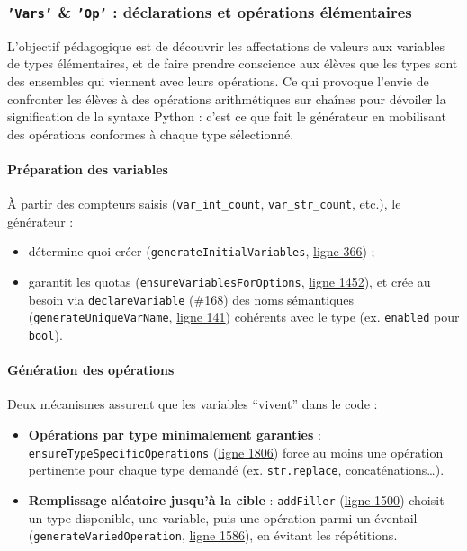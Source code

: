 \documentclass[11pt,a4paper]{article}
\begin{document}
\subsubsection{\texttt{'Vars'} \& \texttt{'Op'} : déclarations et opérations élémentaires}
L'objectif pédagogique est de découvrir les affectations de valeurs aux variables de types élémentaires, et de faire prendre conscience aux élèves que les types sont des ensembles qui viennent avec leurs opérations. Ce qui provoque l'envie de confronter les élèves à des opérations arithmétiques sur chaînes pour dévoiler la signification de la syntaxe Python : c'est ce que fait le générateur en mobilisant des opérations conformes à chaque type sélectionné.

\paragraph{Préparation des variables}
À partir des compteurs saisis (\texttt{var\_int\_count}, \texttt{var\_str\_count}, etc.), le générateur :
\begin{itemize}
  \item détermine quoi créer (\texttt{generateInitialVariables}, \href{https://github.com/edu-mateescoj/gyminf/blob/main/static/js/code-generator.js#L1083}{ligne 366}) ;
  \item garantit les quotas (\texttt{ensureVariablesForOptions}, \href{https://github.com/edu-mateescoj/gyminf/blob/main/static/js/code-generator.js#L1083}{ligne 1452}), et crée au besoin via \texttt{declareVariable} (\#168) des noms sémantiques (\texttt{generateUniqueVarName}, \href{https://github.com/edu-mateescoj/gyminf/blob/main/static/js/code-generator.js#L1083}{ligne 141}) cohérents avec le type (ex. \texttt{enabled} pour \texttt{bool}).
\end{itemize}

\paragraph{Génération des opérations}
Deux mécanismes assurent que les variables “vivent” dans le code :
\begin{itemize}
  \item \textbf{Opérations par type minimalement garanties} : \texttt{ensureTypeSpecificOperations} (\href{https://github.com/edu-mateescoj/gyminf/blob/main/static/js/code-generator.js#L1083}{ligne 1806}) force au moins une opération pertinente pour chaque type demandé (ex. \texttt{str.replace}, concaténations…).
  \item \textbf{Remplissage aléatoire jusqu'à la cible} : \texttt{addFiller} (\href{https://github.com/edu-mateescoj/gyminf/blob/main/static/js/code-generator.js#L1083}{ligne 1500}) choisit un type disponible, une variable, puis une opération parmi un éventail (\texttt{generateVariedOperation}, \href{https://github.com/edu-mateescoj/gyminf/blob/main/static/js/code-generator.js#L1083}{ligne 1586}), en évitant les répétitions.
\end{itemize}
\end{document}
